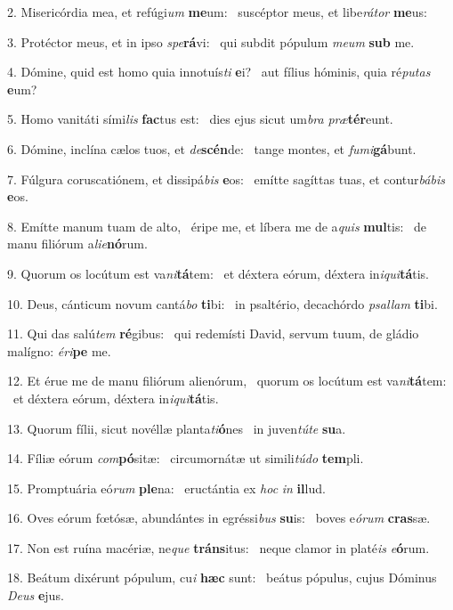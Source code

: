 2. Misericórdia mea, et refúgi\textit{um} \textbf{me}um: \ast\  suscéptor meus, et libe\textit{rá}\textit{tor} \textbf{me}us:\

3. Protéctor meus, et in ipso \textit{spe}\textbf{rá}vi: \ast\  qui subdit pópulum \textit{me}\textit{um} \textbf{sub} me.\

4. Dómine, quid est homo quia innotuís\textit{ti} \textbf{e}i? \ast\  aut fílius hóminis, quia ré\textit{pu}\textit{tas} \textbf{e}um?\

5. Homo vanitáti sími\textit{lis} \textbf{fac}tus est: \ast\  dies ejus sicut um\textit{bra} \textit{præ}\textbf{tér}eunt.\

6. Dómine, inclína cælos tuos, et \textit{de}\textbf{scén}de: \ast\  tange montes, et \textit{fu}\textit{mi}\textbf{gá}bunt.\

7. Fúlgura coruscatiónem, et dissipá\textit{bis} \textbf{e}os: \ast\  emítte sagíttas tuas, et contur\textit{bá}\textit{bis} \textbf{e}os.\

8. Emítte manum tuam de alto, \dag\  éripe me, et líbera me de a\textit{quis} \textbf{mul}tis: \ast\  de manu filiórum a\textit{li}\textit{e}\textbf{nó}rum.\

9. Quorum os locútum est va\textit{ni}\textbf{tá}tem: \ast\  et déxtera eórum, déxtera in\textit{i}\textit{qui}\textbf{tá}tis.\

10. Deus, cánticum novum cantá\textit{bo} \textbf{ti}bi: \ast\  in psaltério, decachórdo \textit{psal}\textit{lam} \textbf{ti}bi.\

11. Qui das salú\textit{tem} \textbf{ré}gibus: \ast\  qui redemísti David, servum tuum, de gládio malígno: \textit{é}\textit{ri}\textbf{pe} me.\

12. Et érue me de manu filiórum alienórum, \dag\  quorum os locútum est va\textit{ni}\textbf{tá}tem: \ast\  et déxtera eórum, déxtera in\textit{i}\textit{qui}\textbf{tá}tis.\

13. Quorum fílii, sicut novéllæ planta\textit{ti}\textbf{ó}nes \ast\  in juven\textit{tú}\textit{te} \textbf{su}a.\

14. Fíliæ eórum \textit{com}\textbf{pó}sitæ: \ast\  circumornátæ ut simili\textit{tú}\textit{do} \textbf{tem}pli.\

15. Promptuária eó\textit{rum} \textbf{ple}na: \ast\  eructántia ex \textit{hoc} \textit{in} \textbf{il}lud.\

16. Oves eórum fœtósæ, abundántes in egréssi\textit{bus} \textbf{su}is: \ast\  boves e\textit{ó}\textit{rum} \textbf{cras}sæ.\

17. Non est ruína macériæ, ne\textit{que} \textbf{tráns}itus: \ast\  neque clamor in platé\textit{is} \textit{e}\textbf{ó}rum.\

18. Beátum dixérunt pópulum, cu\textit{i} \textbf{hæc} sunt: \ast\  beátus pópulus, cujus Dóminus \textit{De}\textit{us} \textbf{e}jus.\

